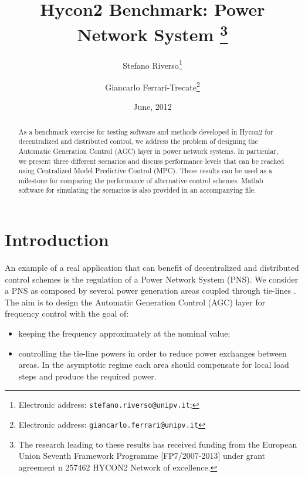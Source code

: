 \documentclass[a4paper]{article}
\begin{document}
     \title{Hycon2 Benchmark: Power Network System \thanks{The research leading to these results has received funding from the European Union Seventh Framework Programme [FP7/2007-2013]  under grant agreement n 257462 HYCON2 Network of excellence.}}
     \author{Stefano Riverso\thanks{Electronic address: \texttt{stefano.riverso@unipv.it};}} 
     \affil{}

     \author{Giancarlo Ferrari-Trecate\thanks{Electronic address: \texttt{giancarlo.ferrari@unipv.it}}} 

     \date{June, 2012}

     \maketitle 


     \begin{abstract}
       As a benchmark exercise for testing software and methods developed in Hycon2 for decentralized and distributed control, we address the problem of designing the Automatic Generation Control (AGC) layer in power network systems. In particular, we present three different scenarios and discuss performance levels that can be reached using Centralized Model Predictive Control (MPC). These results can be used as a milestone for comparing the performance of alternative control schemes. Matlab software for simulating the scenarios is also provided in an accompanying file.
     \end{abstract}

     \newpage

     \section{Introduction}
          \label{sec:PNS}
          An example of a real application that can benefit of decentralized and distributed control schemes is the regulation of a Power Network System (PNS). We consider a PNS as composed by several power generation areas coupled through tie-lines \cite{Saadat2002}. The aim is to design the Automatic Generation Control (AGC) layer for frequency control with the goal of: 
          \begin{itemize}
          \item keeping the frequency approximately at the nominal value;
          \item controlling the tie-line powers in order to reduce power exchanges between areas. In the asymptotic regime each area should compensate for local load steps and produce the required power.
          \end{itemize}
          
\end{document}
